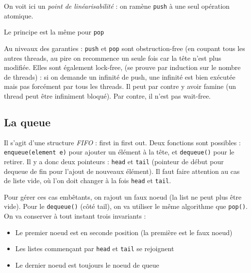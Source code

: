 \documentclass{article}
\begin{document}
On voit ici un \emph{point de linéarisabilité} : on ramène \texttt{push} à une seul opération atomique.

Le principe est la même pour \texttt{pop}


\begin{algorithm}[H]
\end{algorithm}

Au niveaux des garanties : \texttt{push} et \texttt{pop} sont obstruction-free (en coupant tous les autres threads, au pire on recommence un seule fois car la tête n'est plus modifiée. Elles sont également lock-free, (se prouve par induction sur le nombre de threads) : si on demande un infinité de push, une infinité est bien exécutée mais pas forcément par tous les threads. Il peut par contre y avoir famine (un thread peut être infiniment bloqué). Par contre, il n'est pas wait-free.


\subsection{La queue}
Il s'agit d'une structure \emph{FIFO} : first in first out. Deux fonctions sont possibles : \texttt{enqueue(element e)} pour ajouter un élément à la tête, et \texttt{dequeue()} pour le retirer. Il y a donc deux pointeurs : \texttt{head} et \texttt{tail} (pointeur de début pour dequeue de fin pour l'ajout de nouveaux élément). Il faut faire attention au cas de liste vide, où l'on doit changer à la fois \texttt{head} et \texttt{tail}.

Pour gérer ces cas embêtants, on rajout un faux noeud (la list ne peut plus être vide). Pour le \texttt{dequeue()} (côté tail), on va utiliser le même algorithme que \texttt{pop()}. On va conserver à tout instant trois invariants :
\begin{itemize}
\item Le premier noeud est en seconde position (la première est le faux noeud)
\item Les listes commençant par \texttt{head} et \texttt{tail} se rejoignent
\item Le dernier noeud est toujours le noeud de queue
\end{itemize}

\begin{algorithm}[H]
\end{algorithm}
\end{document}
